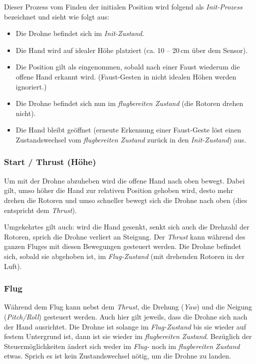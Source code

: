 Dieser Prozess vom Finden der initialen Position wird folgend als \textit{Init-Prozess} bezeichnet und sieht wie folgt aus:

\begin{itemize}
	\item Die Drohne befindet sich im \textit{Init-Zustand}.
	\item Die Hand wird auf idealer Höhe platziert (ca. 10 -- 20\,cm über dem Sensor).
	\item Die Position gilt als eingenommen, sobald nach einer Faust wiederum die offene Hand erkannt wird. (Faust-Gesten in nicht idealen Höhen werden ignoriert.)
	\item Die Drohne befindet sich nun im \textit{flugbereiten Zustand} (die Rotoren drehen nicht).
	\item Die Hand bleibt geöffnet (erneute Erkennung einer Faust-Geste löst einen Zustandswechsel vom \textit{flugbereiten Zustand} zurück in den \textit{Init-Zustand}) aus.
\end{itemize}

\subsubsection{Start / Thrust (Höhe)}
Um mit der Drohne abzuheben wird die offene Hand nach oben bewegt. Dabei gilt, umso höher die Hand zur relativen Position gehoben wird, desto mehr drehen die Rotoren und umso schneller bewegt sich die Drohne nach oben (dies entspricht dem \textit{Thrust}).

Umgekehrtes gilt auch: wird die Hand gesenkt, senkt sich auch die Drehzahl der Rotoren, sprich die Drohne verliert an Steigung.
Der \textit{Thrust} kann während des ganzen Fluges mit diesen Bewegungen gesteuert werden.
Die Drohne befindet sich, sobald sie abgehoben ist, im \textit{Flug-Zustand} (mit drehenden Rotoren in der Luft).

\subsubsection{Flug}
Während dem Flug kann nebst dem \textit{Thrust}, die Drehung (\textit{Yaw}) und die Neigung (\textit{Pitch/Roll}) gesteuert werden.
Auch hier gilt jeweils, dass die Drohne sich nach der Hand ausrichtet.
Die Drohne ist solange im \textit{Flug-Zustand} bis sie wieder auf festem Untergrund ist, dann ist sie wieder im \textit{flugbereiten Zustand}.
Bezüglich der Steuermöglichkeiten ändert sich weder im \textit{Flug-} noch im \textit{flugbereiten Zustand} etwas.
Sprich es ist kein Zustandswechsel nötig, um die Drohne zu landen.

